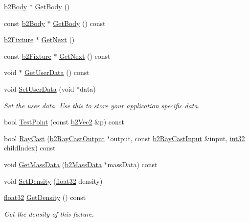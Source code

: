\begin{DoxyCompactItemize}
\mbox{\hyperlink{classb2_body}{b2\+Body}} $\ast$ \mbox{\hyperlink{classb2_fixture_a9d6536ef274d768e86ab0a8330921535}{Get\+Body}} ()
\item 
const \mbox{\hyperlink{classb2_body}{b2\+Body}} $\ast$ \mbox{\hyperlink{classb2_fixture_ae9cabf82e360f92e8fcb36b1923ab991}{Get\+Body}} () const
\item 
\mbox{\hyperlink{classb2_fixture}{b2\+Fixture}} $\ast$ \mbox{\hyperlink{classb2_fixture_a0241952461f6f1a04a3c850306390fd2}{Get\+Next}} ()
\item 
const \mbox{\hyperlink{classb2_fixture}{b2\+Fixture}} $\ast$ \mbox{\hyperlink{classb2_fixture_a6b474fa22b49de3dbe446a67f021beb2}{Get\+Next}} () const
\item 
void $\ast$ \mbox{\hyperlink{classb2_fixture_ae2a865ed59ffe9b1cb89f577052f4d50}{Get\+User\+Data}} () const
\item 
void \mbox{\hyperlink{classb2_fixture_a3db7f89ef4493247d922fe3d96351ad9}{Set\+User\+Data}} (void $\ast$data)
\begin{DoxyCompactList}\small\item\em Set the user data. Use this to store your application specific data. \end{DoxyCompactList}\item 
bool \mbox{\hyperlink{classb2_fixture_aa56d3ca04a5d0478c6477876cd480cc6}{Test\+Point}} (const \mbox{\hyperlink{structb2_vec2}{b2\+Vec2}} \&p) const
\item 
bool \mbox{\hyperlink{classb2_fixture_aaaafd69aa3e1a922acc4b9d7fb49170a}{Ray\+Cast}} (\mbox{\hyperlink{structb2_ray_cast_output}{b2\+Ray\+Cast\+Output}} $\ast$output, const \mbox{\hyperlink{structb2_ray_cast_input}{b2\+Ray\+Cast\+Input}} \&input, \mbox{\hyperlink{b2_settings_8h_a43d43196463bde49cb067f5c20ab8481}{int32}} child\+Index) const
\item 
void \mbox{\hyperlink{classb2_fixture_a4532a12e848c5ceb5a3b94cf45b7cbad}{Get\+Mass\+Data}} (\mbox{\hyperlink{structb2_mass_data}{b2\+Mass\+Data}} $\ast$mass\+Data) const
\item 
void \mbox{\hyperlink{classb2_fixture_ad4e1d9323103975c8931d022b952d04a}{Set\+Density}} (\mbox{\hyperlink{b2_settings_8h_aacdc525d6f7bddb3ae95d5c311bd06a1}{float32}} density)
\item 
\mbox{\hyperlink{b2_settings_8h_aacdc525d6f7bddb3ae95d5c311bd06a1}{float32}} \mbox{\hyperlink{classb2_fixture_a228861bb1b1d7b2fb6e091401340784e}{Get\+Density}} () const
\begin{DoxyCompactList}\small\item\em Get the density of this fixture. \end{DoxyCompactList}\item 

\end{DoxyCompactItemize}
